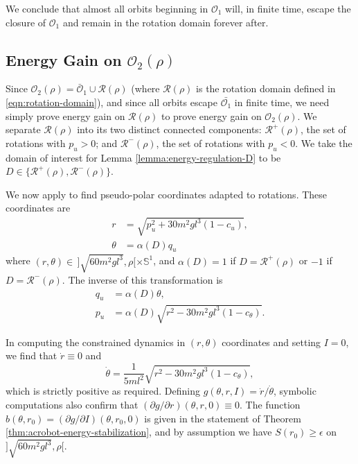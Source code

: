 \documentclass[journal,twoside,web, twocolumn,draftcls]{ieeecolor}
\newcommand*{\Sone}{\mathbb{S}^1}
\begin{document}
We conclude that almost all orbits beginning in \(\mathcal{O}_1\) will, in
finite time, escape the closure of \(\mathcal{O}_1\) and remain in the rotation
domain forever after.

\subsection{Energy Gain on \(\mathcal{O}_2(\rho)\)}
Since \(\mathcal{O}_2(\rho) = \bar{\mathcal{O}}_1 \cup \mathcal{R}(\rho)\)
(where \(\mathcal{R}(\rho)\) is the rotation domain defined in
\eqref{eqn:rotation-domain}), and since all orbits escape 
\(\bar{\mathcal{O}_1}\) in finite time, we need simply prove energy gain on
\(\mathcal{R}(\rho)\) to prove energy gain on \(\mathcal{O}_2(\rho)\).
We separate \(\mathcal{R}(\rho)\) into its two distinct connected components:
\(\mathcal{R}^+(\rho)\), the set of rotations with \(p_u > 0\); 
and \(\mathcal{R}^-(\rho)\), the set of rotations with \(p_u < 0\).
We take the domain of interest for Lemma \ref{lemma:energy-regulation-D} to be
\(D \in \{\mathcal{R}^+(\rho), \mathcal{R}^-(\rho)\}\).

We now apply
\cite[Eqn. (8)]{dynamic_vhcs_stabilize_closed_orbits} to find pseudo-polar coordinates
adapted to rotations.
These coordinates are 
\begin{align}
    \label{eqn:r-rot}
    r &= \sqrt{p_u^2 + 30m^2gl^3(1-c_u)}
    , \\
    \label{eqn:theta-rot}
    \theta &= \alpha(D) q_u
\end{align}
where \((r,\theta) \in \, ]\sqrt{60m^2gl^3}, \rho[ \times \Sone\),
and \(\alpha(D) = 1\) if \(D = \mathcal{R}^+(\rho)\)
or \(-1\) if \(D = \mathcal{R}^-(\rho)\).
The inverse of this transformation is
\begin{align*}
    q_u &= \alpha(D) \theta
    , \\
    p_u &= \alpha(D) \sqrt{r^2-30m^2gl^3(1-c_\theta)}
    .
\end{align*}

In computing the constrained dynamics in
\((r,\theta)\) coordinates and setting \(I = 0\), 
we find that \(\dot{r} \equiv 0\) and
\[
\dot{\theta} = \frac{1}{5ml^2} \sqrt{r^2 - 30m^2gl^3(1-c_\theta)}
,
\]
which is strictly positive as required.
Defining \(g(\theta,r,I) = \dot{r}/\dot{\theta}\), symbolic computations
also confirm that \((\partial g/\partial r)(\theta,r,0) \equiv 0\).
The function \(b(\theta,r_0) = (\partial g/\partial I)(\theta,r_0,0)\) is given
in the statement of Theorem \ref{thm:acrobot-energy-stabilization}, and by
assumption we have \(S(r_0) \geq \epsilon\) on
\(]\sqrt{60m^2gl^3},\rho[\).
\end{document}
